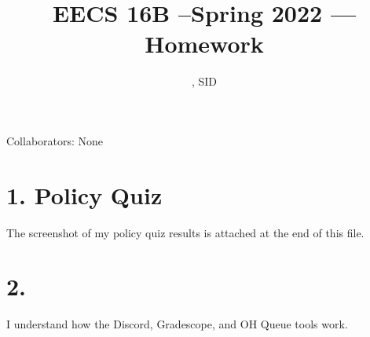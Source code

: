\documentclass[11pt]{article}
\title{EECS 16B --Spring 2022 --- Homework \Homework}
\author{\Name, SID \SID}
\date{}
\begin{document}
\maketitle

Collaborators: None

\section*{1. Policy Quiz}
The screenshot of my policy quiz results is attached at the end of this file.

\newpage
\section*{2.}
I understand how the Discord, Gradescope, and OH Queue tools work.

\newpage
\end{document}
